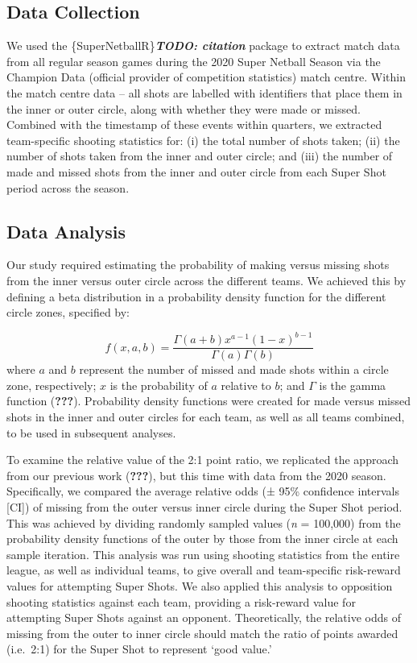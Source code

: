 \documentclass[]{elsarticle} %
\begin{document}
\hypertarget{data-collection}{%
\subsection{Data Collection}\label{data-collection}}

We used the \{SuperNetballR\}\textbf{\emph{TODO: citation}} package to
extract match data from all regular season games during the 2020 Super
Netball Season via the Champion Data (official provider of competition
statistics) match centre. Within the match centre data -- all shots are
labelled with identifiers that place them in the inner or outer circle,
along with whether they were made or missed. Combined with the timestamp
of these events within quarters, we extracted team-specific shooting
statistics for: (i) the total number of shots taken; (ii) the number of
shots taken from the inner and outer circle; and (iii) the number of
made and missed shots from the inner and outer circle from each Super
Shot period across the season.

\hypertarget{data-analysis}{%
\subsection{Data Analysis}\label{data-analysis}}

Our study required estimating the probability of making versus missing
shots from the inner versus outer circle across the different teams. We
achieved this by defining a beta distribution in a probability density
function for the different circle zones, specified by:

\[f(x,a,b) = \frac{\Gamma(a+b)x^{a-1}(1-x)^{b-1}}{\Gamma(a)\Gamma(b)} \]
where \(a\) and \(b\) represent the number of missed and made shots
within a circle zone, respectively; \(x\) is the probability of \(a\)
relative to \(b\); and \(\Gamma\) is the gamma function
({\textbf{???}}). Probability density functions were created for made
versus missed shots in the inner and outer circles for each team, as
well as all teams combined, to be used in subsequent analyses.

To examine the relative value of the 2:1 point ratio, we replicated the
approach from our previous work ({\textbf{???}}), but this time with
data from the 2020 season. Specifically, we compared the average
relative odds (± 95\% confidence intervals {[}CI{]}) of missing from the
outer versus inner circle during the Super Shot period. This was
achieved by dividing randomly sampled values (\emph{n} = 100,000) from
the probability density functions of the outer by those from the inner
circle at each sample iteration. This analysis was run using shooting
statistics from the entire league, as well as individual teams, to give
overall and team-specific risk-reward values for attempting Super Shots.
We also applied this analysis to opposition shooting statistics against
each team, providing a risk-reward value for attempting Super Shots
against an opponent. Theoretically, the relative odds of missing from
the outer to inner circle should match the ratio of points awarded
(i.e.~2:1) for the Super Shot to represent `good value.'
\end{document}
